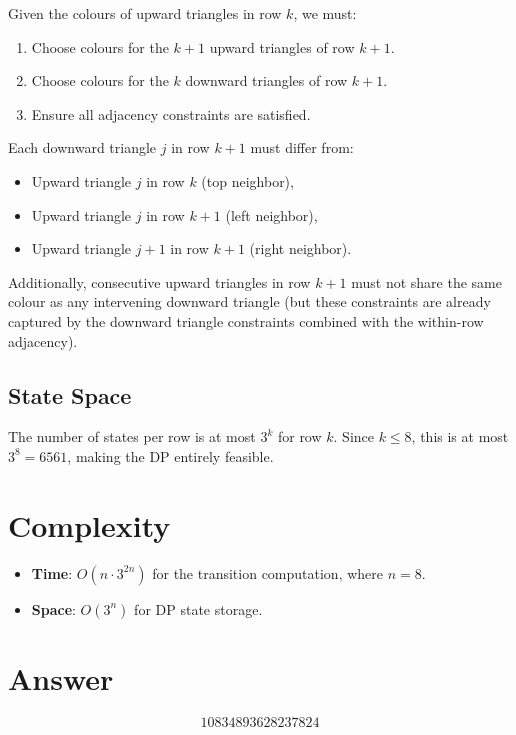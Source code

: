 \documentclass[12pt]{article}
\begin{document}
Given the colours of upward triangles in row $k$, we must:
\begin{enumerate}
    \item Choose colours for the $k+1$ upward triangles of row $k+1$.
    \item Choose colours for the $k$ downward triangles of row $k+1$.
    \item Ensure all adjacency constraints are satisfied.
\end{enumerate}

Each downward triangle $j$ in row $k+1$ must differ from:
\begin{itemize}
    \item Upward triangle $j$ in row $k$ (top neighbor),
    \item Upward triangle $j$ in row $k+1$ (left neighbor),
    \item Upward triangle $j+1$ in row $k+1$ (right neighbor).
\end{itemize}

Additionally, consecutive upward triangles in row $k+1$ must not share the same colour as any intervening downward triangle (but these constraints are already captured by the downward triangle constraints combined with the within-row adjacency).

\subsection{State Space}

The number of states per row is at most $3^k$ for row $k$. Since $k \le 8$, this is at most $3^8 = 6561$, making the DP entirely feasible.

\section{Complexity}

\begin{itemize}
    \item \textbf{Time}: $O(n \cdot 3^{2n})$ for the transition computation, where $n = 8$.
    \item \textbf{Space}: $O(3^n)$ for DP state storage.
\end{itemize}

\section{Answer}

\[
\boxed{10834893628237824}
\]
\end{document}

